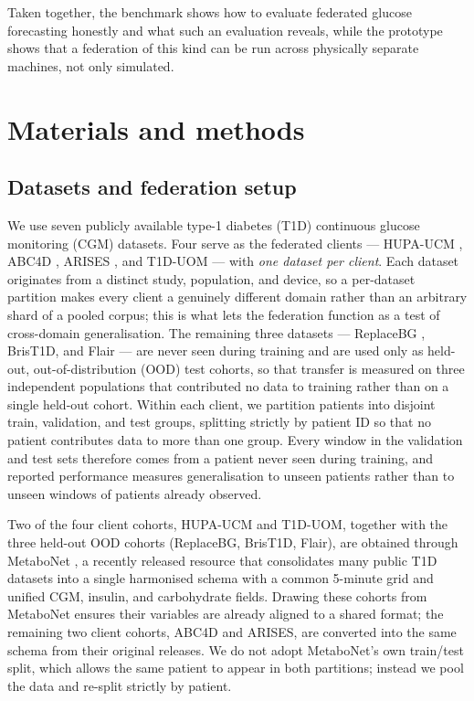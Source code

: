 \documentclass[10pt,letterpaper]{article}
\begin{document}
Taken together, the benchmark shows how to evaluate federated glucose
forecasting honestly and what such an evaluation reveals, while the prototype
shows that a federation of this kind can be run across physically separate
machines, not only simulated.

\section*{Materials and methods}

\subsection*{Datasets and federation setup}

We use seven publicly available type-1 diabetes (T1D) continuous glucose
monitoring (CGM) datasets. Four serve as the federated clients --- HUPA-UCM
\cite{hidalgo2024hupaucm}, ABC4D \cite{abc4d_nct}, ARISES \cite{zhu2022arises},
and T1D-UOM \cite{alsuhaymi2025t1duom} --- with \emph{one dataset per client}. Each dataset
originates from a distinct study, population, and device, so a per-dataset
partition makes every client a genuinely different domain rather than an
arbitrary shard of a pooled corpus; this is what lets the federation function as
a test of cross-domain generalisation. The remaining three datasets ---
ReplaceBG \cite{aleppo2017replacebg}, BrisT1D, and Flair --- are never seen
during training and are used only as held-out, out-of-distribution (OOD) test
cohorts, so that transfer is measured on three independent populations that
contributed no data to training rather than on a single held-out cohort. Within
each client, we partition patients
into disjoint train, validation, and test groups, splitting strictly by
patient ID so that no patient contributes data to more than one group. Every
window in the validation and test sets therefore comes from a patient never
seen during training, and reported performance measures generalisation to
unseen patients rather than to unseen windows of patients already observed.

Two of the four client cohorts, HUPA-UCM and T1D-UOM, together with the three
held-out OOD cohorts (ReplaceBG, BrisT1D, Flair), are obtained through MetaboNet
\cite{wolff2026metabonet}, a recently released resource that consolidates many
public T1D datasets into a single harmonised schema with a common 5-minute grid
and unified CGM, insulin, and carbohydrate fields. Drawing these cohorts from
MetaboNet ensures their variables are already aligned to a shared format; the
remaining two client cohorts, ABC4D and ARISES, are converted into the same
schema from their original releases. We do not adopt MetaboNet's own train/test split,
which allows the same patient to appear in both partitions; instead we pool the
data and re-split strictly by patient.
\end{document}
